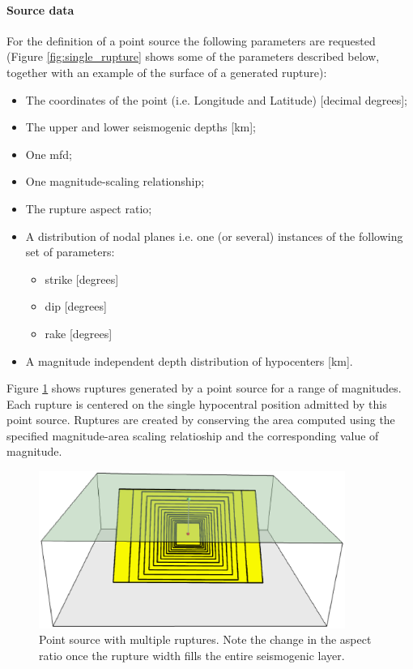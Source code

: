 \paragraph{Source data}
%
For the definition of a point source the following 
parameters are requested (Figure \ref{fig:single_rupture} shows some of 
the parameters described below, together with an example of the 
surface of a generated rupture):
\begin{itemize}
\item The coordinates of the point (i.e. Longitude and Latitude) [decimal 
    degrees];
\item The upper and lower seismogenic depths [km];
\item One \gls{mfd};
\item One magnitude-scaling relationship;
\item The rupture aspect ratio;
\item A distribution of nodal planes i.e. one (or several) instances 
    of the following set of parameters:
\begin{itemize}
    \item \gls{strike} [degrees]
    \item \gls{dip} [degrees]
    \item \gls{rake} [degrees]
\end{itemize}
\item A magnitude independent depth distribution of hypocenters [km]. 
\end{itemize}
%
Figure \ref{fig:point_source_multiple_ruptures} shows ruptures 
generated by a point source for a range of magnitudes. 
Each rupture is centered on the single hypocentral position 
admitted by this point source. 
Ruptures are created by conserving the area computed
using the specified mag\-ni\-tude-area scaling relatioship and the
corresponding value of magnitude.
\begin{figure}[ht!]
\centering
\includegraphics[width=10cm]{./figures/hazard/point_source_multiple_ruptures.ps}
\caption{Point source with multiple ruptures. Note the change in the aspect 
ratio once the rupture width fills the entire seismogenic layer.}
\label{fig:point_source_multiple_ruptures}
\end{figure}

